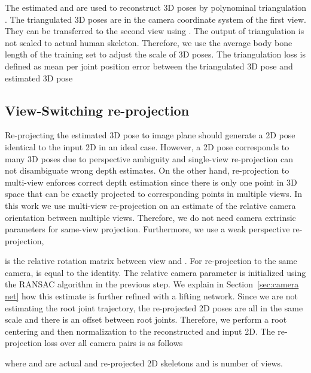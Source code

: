 \documentclass[10pt,twocolumn,letterpaper]{article}
\begin{document}
The estimated  and  are used to reconstruct 3D poses by polynominal triangulation \cite{hartley_triangulation_1997}. The triangulated 3D poses are in the camera coordinate system of the first view. They can be transferred to the second view using . The output of triangulation is not scaled to actual human skeleton. Therefore, we use the average body bone length of the training set to adjust the scale of 3D poses. The triangulation loss is defined as mean per joint position error between the triangulated 3D pose  and estimated 3D pose  



\subsection{View-Switching re-projection}
Re-projecting the estimated 3D pose to image plane should generate a 2D pose identical to the input 2D in an ideal case. However, a 2D pose corresponds to many 3D poses due to perspective ambiguity and single-view re-projection can not disambiguate wrong depth estimates. On the other hand, re-projection to multi-view enforces correct depth estimation since there is only one point in 3D space that can be exactly projected to corresponding points in multiple views. In this work we use multi-view re-projection on an estimate of the relative camera orientation between multiple views. Therefore, we do not need camera extrinsic parameters for same-view projection. Furthermore, we use a weak perspective re-projection,

 is the relative rotation matrix between view   and .
For re-projection to the same camera,  is equal to the identity. The relative camera parameter is initialized using the RANSAC algorithm in the previous step. We explain in Section~\ref{sec:camera net} how this estimate  is further refined with a lifting network. Since we are not estimating the root joint trajectory, the re-projected 2D poses are all in the same scale and there is an offset between root joints. Therefore, we perform a root centering and then normalization to the reconstructed and input 2D. The re-projection loss over all camera pairs  is as follows


where  and  are actual and re-projected 2D skeletons and  is number of views.
\end{document}
